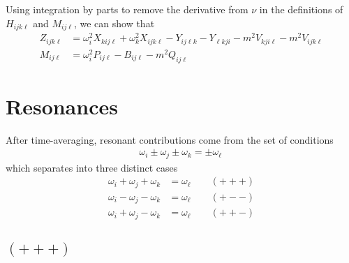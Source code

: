 \documentclass[letterpaper,11pt]{article}
\newcommand{\oi}{\omega_i}
\newcommand{\oj}{\omega_j}
\newcommand{\ok}{\omega_k}
\newcommand{\ol}{\omega_\ell}
\begin{document}
Using integration by parts to remove the derivative from $\nu$ in the definitions of $H_{ijk\ell}$ and $M_{ij\ell}$, we can show that
\begin{align}
Z_{ijk\ell} &= \oi^2 X_{kij\ell} + \ok^2 X_{ijk\ell} - Y_{ij\ell k}  - Y_{\ell kji}   - m^2 V_{kji\ell} -m^2 V_{ijk\ell} \\
M_{ij\ell} &= \oi^2 P_{ij\ell} - B_{ij\ell} -m^2 Q_{ij\ell}
\end{align}


\section{Resonances}
After time-averaging, resonant contributions come from the set of conditions
\begin{align}
\oi \pm \oj \pm \ok = \pm \ol \,
\end{align}
which separates into three distinct cases
\begin{align}
\oi + \oj + \ok &= \ol \qquad (+++) \\
\oi - \oj - \ok &= \ol \qquad (+--) \\
\oi + \oj - \ok &= \ol \qquad (++-)
\end{align}


\subsection{$(+++)$}
\end{document}

